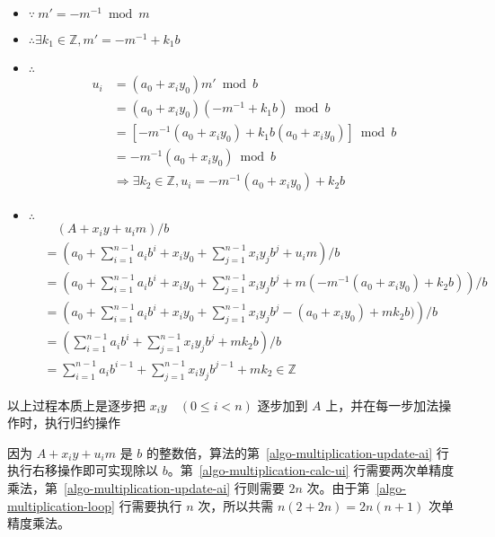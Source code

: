 \begin{note}\
  \begin{itemize}[label={}]
    \item \(\because\ m'=-m^{-1}\bmod m\)
    \item \(\therefore \exists k_1\in\mathbb{Z}, m'=-m^{-1}+k_1b\)
    \item \(\therefore\) 
      \begin{align*}
        u_i &= (a_0+x_i y_0)m'\bmod b \\
            &= (a_0+x_i y_0)(-m^{-1}+k_1 b)\bmod b \\
            &= [-m^{-1}(a_0+x_i y_0) + k_1 b (a_0+x_i y_0)]\bmod b \\
            &= -m^{-1}(a_0+x_i y_0)\bmod b \\
            &\Rightarrow \exists k_2\in\mathbb{Z}, u_i=-m^{-1}(a_0+x_i y_0)+k_2b
      \end{align*}
    \item \(\therefore\) 
      \begin{align*}
        &\quad (A+x_i y+u_im)/b \\
        &= \left(a_0 + \sum_{i=1}^{n-1}a_i b^i + x_i y_0 + \sum_{j=1}^{n-1} x_i y_j b^j + u_i m\right)/b \\
        &= \left(a_0 + \sum_{i=1}^{n-1}a_i b^i + x_i y_0 + \sum_{j=1}^{n-1} x_i y_j b^j + m(-m^{-1}(a_0+x_i y_0)+k_2b) \right)/b \\
        &= \left(a_0 + \sum_{i=1}^{n-1}a_i b^i + x_i y_0 + \sum_{j=1}^{n-1} x_i y_j b^j - (a_0+x_i y_0) + mk_2b) \right)/b \\
        &= \left(\sum_{i=1}^{n-1}a_i b^i + \sum_{j=1}^{n-1} x_i y_j b^j + mk_2b \right)/b \\
        &= \sum_{i=1}^{n-1}a_i b^{i-1} + \sum_{j=1}^{n-1} x_i y_j b^{j-1} + mk_2 \in \mathbb{Z}
      \end{align*}
  \end{itemize} 

  以上过程本质上是逐步把 \(x_i y\quad(0\le i<n)\) 逐步加到 \(A\) 上，并在每一步加法操作时，执行归约操作
\end{note}

\begin{note}
  因为 \(A+x_i y+u_im\) 是 \(b\) 的整数倍，算法的第~\ref{algo-multiplication-update-ai} 行执行右移操作即可实现除以 \(b\)。第~\ref{algo-multiplication-calc-ui} 行需要两次单精度乘法，第~\ref{algo-multiplication-update-ai} 行则需要 \(2n\) 次。由于第~\ref{algo-multiplication-loop} 行需要执行 \(n\) 次，所以共需 \(n(2+2n)=2n(n+1)\) 次单精度乘法。
\end{note}

